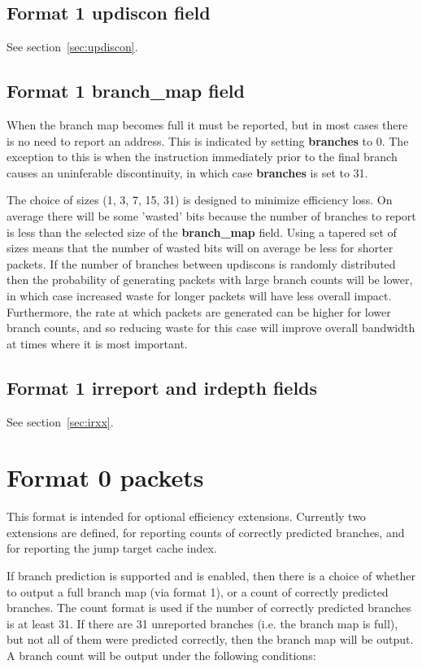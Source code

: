 \subsection{Format 1 \textbf{updiscon} field}

See section~\ref{sec:updiscon}.

\subsection{Format 1 \textbf{branch\_map} field}
When the branch map becomes full it must be reported, but in most cases there is no need to report an address.
This is indicated by setting \textbf{branches} to 0.  The exception to this is when the instruction immediately prior to 
the final branch causes an uninferable discontinuity, in which case \textbf{branches} is set to 31.

The choice of sizes (1, 3, 7, 15, 31) is designed to minimize efficiency loss.  On average there will be some 'wasted' bits 
because the number of branches to report is less than the selected size of the \textbf{branch\_map} field.
Using a tapered set of sizes means that the number of wasted bits will on average be less for shorter packets.
If the number of branches between updiscons is randomly distributed then the probability of generating packets with large
branch counts will be lower, in which case increased waste for longer packets will have less overall impact.
Furthermore, the rate at which packets are generated can be higher for lower branch counts, and so reducing
waste for this case will improve overall bandwidth at times where it is most important.

\subsection{Format 1 \textbf{irreport} and \textbf{irdepth} fields}

See section~\ref{sec:irxx}.

\FloatBarrier
\section{Format 0 packets} \label{sec:format0}

This format is intended for optional efficiency extensions.  Currently two extensions are defined, for reporting counts of
correctly predicted branches, and for reporting the jump target cache index.

If branch prediction is supported and is enabled, then there is a choice of whether to output a 
full branch map (via format 1), or a count of correctly predicted branches.  
The count format is used if the number of correctly predicted branches is at least 31.  If there are 31 unreported 
branches (i.e. the branch map is full), but not all of them were predicted correctly, then the branch map will be output.  
A branch count will be output under the following conditions:

